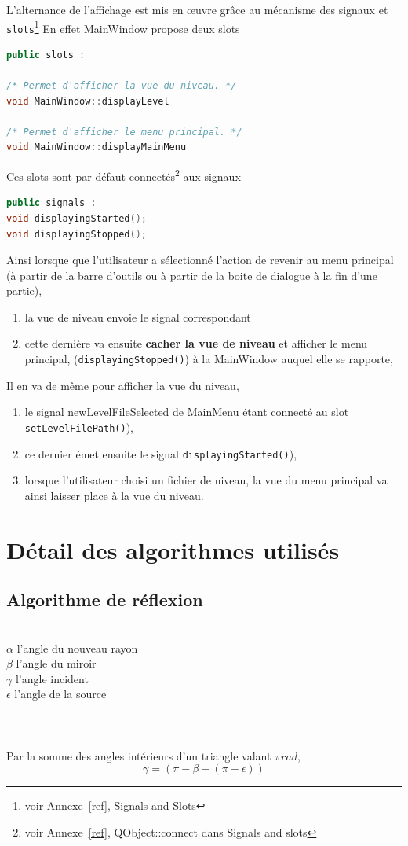 \documentclass[a4paper,11pt]{report}
\begin{document}
\newpage
L'alternance de l'affichage est mis en œuvre grâce au mécanisme des
signaux et \texttt{slots}\footnote{voir Annexe~\ref{ref}, Signals and Slots}
En effet MainWindow propose deux slots 
\begin{lstlisting}[title=MainWindow,frame=single,language=C++]
public slots :

/* Permet d'afficher la vue du niveau. */
void MainWindow::displayLevel 

/* Permet d'afficher le menu principal. */
void MainWindow::displayMainMenu 
\end{lstlisting}
Ces slots sont par défaut connectés\footnote{voir Annexe~\ref{ref},
QObject::connect dans Signals and slots} aux signaux 
\begin{lstlisting}[title=LevelView,frame=single,language=C++]
public signals : 
void displayingStarted();
void displayingStopped();
\end{lstlisting}
Ainsi lorsque que l'utilisateur a sélectionné l'action de revenir au menu
principal (à partir de la barre d'outils ou à partir de la boite de dialogue à
la fin d'une partie), 

\begin{enumerate}
	\item la vue de niveau envoie le signal correspondant
	\item cette dernière va ensuite \textbf{cacher la vue de niveau} et afficher le menu principal,
		(\texttt{displayingStopped()}) à la MainWindow auquel elle se rapporte, 
\end{enumerate}

Il en va de même pour afficher la vue du niveau, 
\begin{enumerate}
	\item le signal newLevelFileSelected de MainMenu étant connecté au slot
		\texttt{setLevelFilePath()}),
	\item ce dernier émet ensuite le signal \texttt{displayingStarted()}), 
	\item lorsque l'utilisateur choisi un fichier de niveau, la vue du
		menu principal va ainsi laisser place à la vue du niveau.
\end{enumerate}

\chapter[Algorithmes]{Détail des algorithmes utilisés}
\section[Réflexion]{Algorithme de réflexion}
 \\
$\alpha$ l'angle du nouveau rayon \\
$\beta$ l'angle du miroir \\
$\gamma$ l'angle incident \\
$\epsilon$ l'angle de la source \\ \\ \\ \\
Par la somme des angles intérieurs d'un triangle valant $\pi rad$, \\
$$\gamma = (\pi - \beta - (\pi - \epsilon))$$
\end{document}
